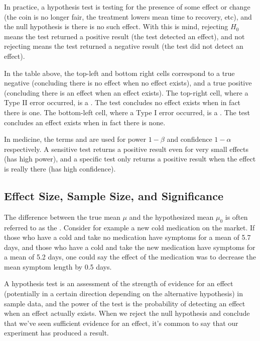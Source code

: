 In practice, a hypothesis test is testing for the presence of some effect or change (the coin is no longer fair, the treatment lowers mean time to recovery, etc), and the null hypothesis is there is no such effect. With this is mind, rejecting $H_0$ means the test returned a positive result (the test detected an effect), and not rejecting means the test returned a negative result (the test did not detect an effect).

In the table above, the top-left and bottom right cells correspond to a true negative (concluding there is no effect when no effect exists), and a true positive (concluding there is an effect when an effect exists). The top-right cell, where a Type II error occurred, is a . The test concludes no effect exists when in fact there is one. The bottom-left cell, where a Type I error occurred, is a . The test concludes an effect exists when in fact there is none.

\begin{remark}
In medicine, the terms  and  are used for power $1-\beta$ and confidence $1-\alpha$ respectively. A sensitive test returns a positive result even for very small effects (has high power), and a specific test only returns a positive result when the effect is really there (has high confidence).
\end{remark}


\subsection*{Effect Size, Sample Size, and Significance}

The difference between the true mean $\mu$ and the hypothesized mean $\mu_0$ is often referred to as the . Consider for example a new cold medication on the market. If those who have a cold and take no medication have symptoms for a mean of 5.7 days, and those who have a cold and take the new medication have symptoms for a mean of 5.2 days, one could say the effect of the medication was to decrease the mean symptom length by 0.5 days.

A hypothesis test is an assessment of the strength of evidence for an effect (potentially in a certain direction depending on the alternative hypothesis) in sample data, and the power of the test is the probability of detecting an effect when an effect actually exists. When we reject the null hypothesis and conclude that we've seen sufficient evidence for an effect, it's common to say that our experiment has produced a  result.

